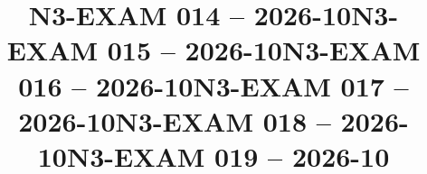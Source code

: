 \documentclass{ip-exam}
\begin{document}







\cleartoeven
\setcounter{questioncounter}{0}
\setcounter{page}{1}
\title{N3-EXAM 014 -- 2026-10}
\makeexamheader








\cleartoeven
\setcounter{questioncounter}{0}
\setcounter{page}{1}
\title{N3-EXAM 015 -- 2026-10}
\makeexamheader








\cleartoeven
\setcounter{questioncounter}{0}
\setcounter{page}{1}
\title{N3-EXAM 016 -- 2026-10}
\makeexamheader








\cleartoeven
\setcounter{questioncounter}{0}
\setcounter{page}{1}
\title{N3-EXAM 017 -- 2026-10}
\makeexamheader








\cleartoeven
\setcounter{questioncounter}{0}
\setcounter{page}{1}
\title{N3-EXAM 018 -- 2026-10}
\makeexamheader








\cleartoeven
\setcounter{questioncounter}{0}
\setcounter{page}{1}
\title{N3-EXAM 019 -- 2026-10}
\makeexamheader
\end{document}
